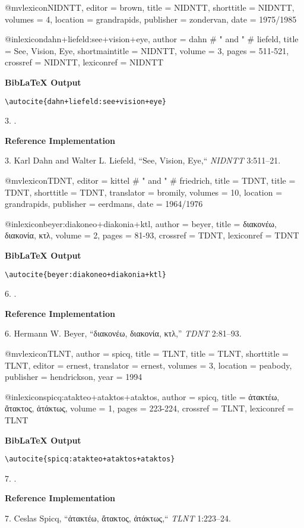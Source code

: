 \documentclass[a4paper]{article}
\newcommand{\gr}[1]{{\greekfont #1}}
\newcommand\citetestlex[2]{%
  {\textbf{BibLaTeX Output}\par
   \nobreak
   \texttt{\textbackslash autocite\{#2\}}\par
   \color{biblatex-colour}
   #1. \cite{#2}.\par}}
\newenvironment{refimp}{%
  \begin{minipage}{\linewidth}
    \setlength{\parskip}{1ex}
    \textbf{Reference Implementation}\par
    \nobreak
    \color{reference-colour}
}{\end{minipage}}
\newenvironment{vb}{%
  \setlength{\parskip}{0pt}
  \verbatim}{\endverbatim}
\begin{document}
\begin{vb}
@mvlexicon{NIDNTT,
  editor = brown,
  title = NIDNTT,
  shorttitle = {NIDNTT},
  volumes = {4},
  location = grandrapids,
  publisher = zondervan,
  date = {1975/1985}
}

@inlexicon{dahn+liefeld:see+vision+eye,
  author = dahn # " and " # liefeld,
  title = {See, Vision, Eye},
  shortmaintitle = {NIDNTT},
  volume = {3},
  pages = {511-521},
  crossref = {NIDNTT},
  lexiconref = {NIDNTT}
}
\end{vb}

\citetestlex{3}{dahn+liefeld:see+vision+eye}

\begin{refimp}
  3. Karl Dahn and Walter L. Liefeld, “See, Vision, Eye,“ \emph{NIDNTT} 3:511–21.
\end{refimp}

\begin{vb}
@mvlexicon{TDNT,
  editor = kittel # " and " # friedrich,
  title = TDNT,
  title = TDNT,
  shorttitle = {TDNT},
  translator = bromily,
  volumes = {10},
  location = grandrapids,
  publisher = eerdmans,
  date = {1964/1976}
}

@inlexicon{beyer:diakoneo+diakonia+ktl,
  author = beyer,
  title = {\gr{διακονέω, διακονία, κτλ}},
  volume = {2},
  pages = {81-93},
  crossref = {TDNT},
  lexiconref = {TDNT}
}
\end{vb}
  
\citetestlex{6}{beyer:diakoneo+diakonia+ktl}

\begin{refimp}
  6. Hermann W. Beyer, “\gr{διακονέω, διακονία, κτλ},” \emph{TDNT} 2:81–93.
\end{refimp}

\begin{vb}
@mvlexicon{TLNT,
  author = spicq,
  title = TLNT,
  title = TLNT,
  shorttitle = {TLNT},
  editor = ernest,
  translator = ernest,
  volumes = {3},
  location = peabody,
  publisher = hendrickson,
  year = {1994}
}

@inlexicon{spicq:atakteo+ataktos+ataktos,
  author = spicq,
  title = {\gr{ἀτακτέω, ἄτακτος, ἀτάκτως}},
  volume = {1},
  pages = {223-224},
  crossref = {TLNT},
  lexiconref = {TLNT}
}
\end{vb}

\citetestlex{7}{spicq:atakteo+ataktos+ataktos}

\begin{refimp}
  7. Ceslas Spicq, “\gr{ἀτακτέω, ἄτακτος, ἀτάκτως},“ \emph{TLNT} 1:223–24.
\end{refimp}
\end{document}
